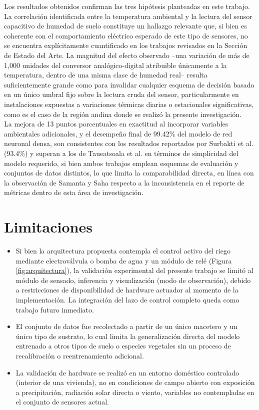 \documentclass[12pt,a4paper]{article}
\begin{document}
Los resultados obtenidos confirman las tres hipótesis planteadas en este trabajo. La correlación identificada entre la temperatura ambiental y la lectura del sensor capacitivo de humedad de suelo constituye un hallazgo relevante que, si bien es coherente con el comportamiento eléctrico esperado de este tipo de sensores, no se encuentra explícitamente cuantificado en los trabajos revisados en la Sección de Estado del Arte. La magnitud del efecto observado --una variación de más de 1{,}000 unidades del conversor analógico-digital atribuible únicamente a la temperatura, dentro de una misma clase de humedad real-- resulta suficientemente grande como para invalidar cualquier esquema de decisión basado en un único umbral fijo sobre la lectura cruda del sensor, particularmente en instalaciones expuestas a variaciones térmicas diarias o estacionales significativas, como es el caso de la región andina donde se realizó la presente investigación.\\

La mejora de 13 puntos porcentuales en exactitud al incorporar variables ambientales adicionales, y el desempeño final de 99.42\% del modelo de red neuronal densa, son consistentes con los resultados reportados por Surbakti et al. \cite{surbakti2025} (93.4\%) y superan a los de Taueatsoala et al. \cite{taueatsoala2026} en términos de simplicidad del modelo requerido, si bien ambos trabajos emplean esquemas de evaluación y conjuntos de datos distintos, lo que limita la comparabilidad directa, en línea con la observación de Samanta y Saha \cite{samanta2026} respecto a la inconsistencia en el reporte de métricas dentro de esta área de investigación.

\section{Limitaciones}
\label{sec:limitaciones}

\begin{itemize}
    \item Si bien la arquitectura propuesta contempla el control activo del riego mediante electroválvula o bomba de agua y un módulo de relé (Figura \ref{fig:arquitectura}), la validación experimental del presente trabajo se limitó al módulo de sensado, inferencia y visualización (modo de observación), debido a restricciones de disponibilidad de hardware actuador al momento de la implementación. La integración del lazo de control completo queda como trabajo futuro inmediato.
    \item El conjunto de datos fue recolectado a partir de un único macetero y un único tipo de sustrato, lo cual limita la generalización directa del modelo entrenado a otros tipos de suelo o especies vegetales sin un proceso de recalibración o reentrenamiento adicional.
    \item La validación de hardware se realizó en un entorno doméstico controlado (interior de una vivienda), no en condiciones de campo abierto con exposición a precipitación, radiación solar directa o viento, variables no contempladas en el conjunto de sensores actual.
\end{itemize}
\end{document}
